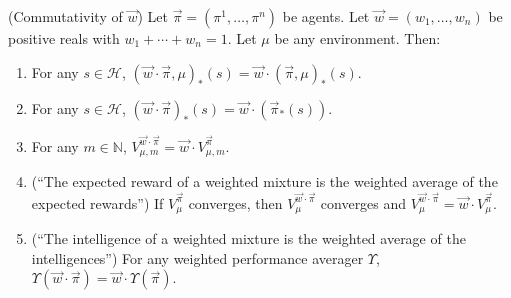 \documentclass[runningheads]{llncs}
\begin{document}
\begin{theorem}
\label{maintheorem}
    (Commutativity of $\vec w$)
    Let $\vec\pi=(\pi^1,\ldots,\pi^n)$ be agents.
    Let $\vec w=(w_1,\ldots,w_n)$ be positive reals with
    $w_1+\cdots+w_n=1$. Let $\mu$ be any environment.
    Then:
    \begin{enumerate}
        \item
        For any $s\in\mathcal H$,
        $(\vec w\cdot \vec\pi,\mu)_*(s)=\vec w\cdot(\vec\pi,\mu)_*(s)$.
        \item
        For any $s\in\mathcal H$,
        $(\vec w\cdot\vec\pi)_*(s)=\vec w\cdot(\vec\pi_*(s))$.
        \item
        For any $m\in\mathbb N$,
        $V^{\vec w\cdot \vec\pi}_{\mu,m}=\vec w\cdot V^{\vec\pi}_{\mu,m}$.
        \item
        (``The expected reward of a weighted mixture is the weighted
        average of the expected rewards'')
        If $V^{\vec\pi}_\mu$ converges, then $V^{\vec w\cdot\vec\pi}_\mu$
        converges and $V^{\vec w\cdot\vec\pi}_\mu=\vec w\cdot V^{\vec\pi}_\mu$.
        \item
        (``The intelligence of a weighted mixture is the weighted average
        of the intelligences'')
        For any weighted performance averager $\Upsilon$,
        $\Upsilon(\vec w\cdot\vec\pi)=\vec w\cdot\Upsilon(\vec\pi)$.
    \end{enumerate}
\end{theorem}
\end{document}
